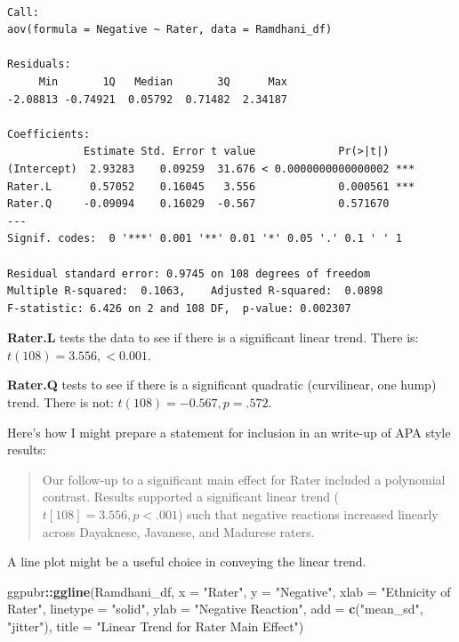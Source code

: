 \documentclass[
  11pt,
]{book}
\newenvironment{Shaded}{\begin{snugshade}}{\end{snugshade}}
\newcommand{\AttributeTok}[1]{\textcolor[rgb]{0.27,0.27,0.27}{#1}}
\newcommand{\FunctionTok}[1]{\textcolor[rgb]{0.27,0.27,0.27}{\textbf{#1}}}
\newcommand{\NormalTok}[1]{#1}
\newcommand{\SpecialCharTok}[1]{\textcolor[rgb]{0.43,0.43,0.43}{\textbf{#1}}}
\newcommand{\StringTok}[1]{\textcolor[rgb]{0.5,0.5,0.5}{#1}}
\begin{document}
\begin{verbatim}

Call:
aov(formula = Negative ~ Rater, data = Ramdhani_df)

Residuals:
     Min       1Q   Median       3Q      Max 
-2.08813 -0.74921  0.05792  0.71482  2.34187 

Coefficients:
            Estimate Std. Error t value             Pr(>|t|)    
(Intercept)  2.93283    0.09259  31.676 < 0.0000000000000002 ***
Rater.L      0.57052    0.16045   3.556             0.000561 ***
Rater.Q     -0.09094    0.16029  -0.567             0.571670    
---
Signif. codes:  0 '***' 0.001 '**' 0.01 '*' 0.05 '.' 0.1 ' ' 1

Residual standard error: 0.9745 on 108 degrees of freedom
Multiple R-squared:  0.1063,    Adjusted R-squared:  0.0898 
F-statistic: 6.426 on 2 and 108 DF,  p-value: 0.002307
\end{verbatim}

\textbf{Rater.L} tests the data to see if there is a significant linear trend. There is: \(t(108) = 3.556, < 0 .001\).

\textbf{Rater.Q} tests to see if there is a significant quadratic (curvilinear, one hump) trend. There is not: \(t(108) = -0.567, p = .572\).

Here's how I might prepare a statement for inclusion in an write-up of APA style results:

\begin{quote}
Our follow-up to a significant main effect for Rater included a polynomial contrast. Results supported a significant linear trend (\(t[108] = 3.556, p < .001\)) such that negative reactions increased linearly across Dayaknese, Javanese, and Madurese raters.
\end{quote}

A line plot might be a useful choice in conveying the linear trend.

\begin{Shaded}
\begin{Highlighting}[]
\NormalTok{ggpubr}\SpecialCharTok{::}\FunctionTok{ggline}\NormalTok{(Ramdhani\_df, }\AttributeTok{x =} \StringTok{"Rater"}\NormalTok{, }\AttributeTok{y =} \StringTok{"Negative"}\NormalTok{, }\AttributeTok{xlab =} \StringTok{"Ethnicity of Rater"}\NormalTok{,}
    \AttributeTok{linetype =} \StringTok{"solid"}\NormalTok{, }\AttributeTok{ylab =} \StringTok{"Negative Reaction"}\NormalTok{, }\AttributeTok{add =} \FunctionTok{c}\NormalTok{(}\StringTok{"mean\_sd"}\NormalTok{,}
        \StringTok{"jitter"}\NormalTok{), }\AttributeTok{title =} \StringTok{"Linear Trend for Rater Main Effect"}\NormalTok{)}
\end{Highlighting}
\end{Shaded}
\end{document}
